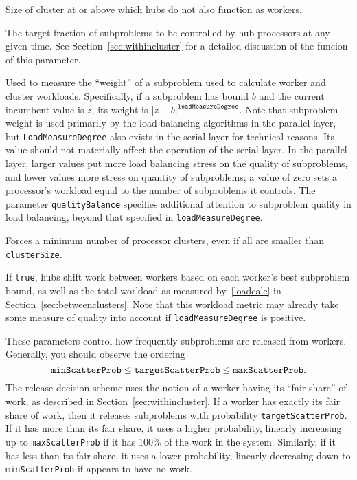 Size of cluster at or above which hubs do not also function as
workers.

The target fraction of subproblems to be controlled by hub
processors at any given time.  See Section~\ref{sec:withincluster} for
a detailed discussion of the funcion of this parameter.

Used to
measure the ``weight'' of a subproblem used to calculate worker and
cluster workloads.  Specifically, if a subproblem has bound $b$ and
the current incumbent value is $z$, its weight is ${\left|z -
b\right|}^{\text{\texttt{loadMeasureDegree}}}$.  Note that subproblem
weight is used primarily by the load balancing algorithms in the
parallel layer, but \texttt{LoadMeasureDegree} also exists in the serial
layer for technical reasons.  
Its value should not materially affect the operation of the serial
layer.  In the parallel layer, larger values put more load balancing
stress on the quality of subproblems, and lower values more stress on
quantity of subproblems; a value of zero sets a processor's workload
equal to the number of subproblems it controls.  The parameter
\texttt{qualityBalance} specifies additional attention to subproblem
quality in load balancing, beyond that specified in
\texttt{loadMeasureDegree}. 
 
Forces a minimum number of processor clusters, even if all are smaller than
\texttt{clusterSize}. 

If \texttt{true}, hubs shift work between workers based on each
worker's best subproblem bound,
as well as the total workload as measured by~\eqref{loadcalc} in
Section~\ref{sec:betweenclusters}.  Note that this workload metric
may already take some measure of quality into account if
\texttt{loadMeasureDegree} is positive.

\groupparams
{}
\groupparams
{}
These parameters control
how frequently subproblems are released from workers.  Generally, you
should observe the ordering
$$
\text{\texttt{minScatterProb}} \leq
\text{\texttt{targetScatterProb}} \leq
\text{\texttt{maxScatterProb}}.
$$ 
The release decision scheme uses the notion of a worker having its
``fair share'' of work, as described in
Section~\ref{sec:withincluster}.  If a
worker has exactly its fair share of work, then it releases subproblems with
probability \texttt{targetScatterProb}.  If it has more than its fair
share, it uses a higher probability, linearly increasing up to
\texttt{maxScatterProb} if it has 100\% of the work in the system.
Similarly, if it has less than its fair share, it uses a lower
probability, linearly decreasing down to \texttt{minScatterProb} if
appears to have no work.

